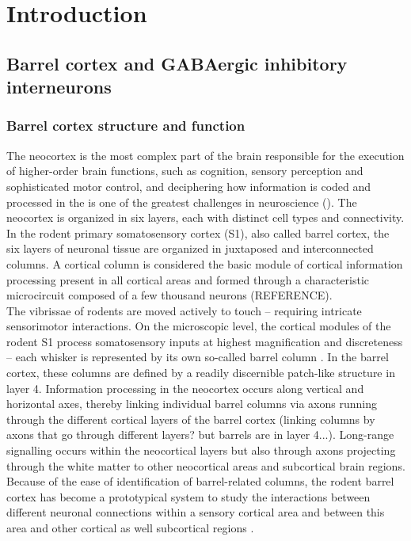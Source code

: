 \chapter{Introduction}
\label{ch:intro}
\acresetall
\section{Barrel cortex and GABAergic inhibitory interneurons}
\label{sec:GABA neurons}
\subsection{Barrel cortex structure and function}
\label{subsec:bcx1}
The neocortex is the most complex part of the brain responsible for the execution of higher-order brain functions, such as cognition, sensory perception and sophisticated motor control, and deciphering how information is coded and processed in the is one of the greatest challenges in neuroscience (\citep{Lodato2016}). The neocortex is organized in six layers, each with distinct cell types and connectivity. In the rodent primary somatosensory cortex (S1), also called barrel cortex, the six layers of neuronal tissue are organized in juxtaposed and interconnected columns. A cortical column is considered the basic module of cortical information processing present in all cortical areas and formed through a characteristic microcircuit composed of a few thousand neurons (REFERENCE). \\
The vibrissae of rodents are moved actively to touch – requiring intricate sensorimotor interactions. On the microscopic level, the cortical modules of the rodent S1 process somatosensory inputs at highest magnification and discreteness – each whisker is represented by its own so-called barrel column \citep{Feldmeyer2013}. In the barrel cortex, these columns are defined by a readily discernible patch-like structure in layer 4. Information processing in the neocortex occurs along vertical and horizontal axes, thereby linking individual barrel columns via axons running through the different cortical layers of the barrel cortex (linking columns by axons that go through different layers? but barrels are in layer 4...). Long-range signalling occurs within the neocortical layers but also through axons projecting through the white matter to other neocortical areas and subcortical brain regions. Because of the ease of identification of barrel-related columns, the rodent barrel cortex has become a prototypical system to study the interactions between different neuronal connections within a sensory cortical area and between this area and other cortical as well subcortical regions \citep{Feldmeyer2012}.
